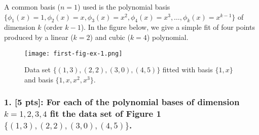 \documentclass{article}
\begin{document}
A common basis (\(n = 1\)) used is the polynomial basis \(\{\phi_1(x) = 1, \phi_2(x) = x, \phi_3(x) = x^2, \phi_4(x) = x^3, \ldots, \phi_k(x) = x^{k-1}\}\) of dimension \(k\) (order \(k - 1\)). In the figure below, we give a simple fit of four points produced by a linear (\(k = 2\)) and cubic (\(k = 4\)) polynomial.

\begin{figure}[H]
    \centering
    \texttt{[image: first-fig-ex-1.png]}
    \caption{Data set \(\{(1,3), (2,2), (3,0), (4,5)\}\) fitted with basis \(\{1, x\}\) and basis \(\{1, x, x^2, x^3\}\).}
    \label{fig:enter-label}
\end{figure}

\subsubsection*{1. [5 pts]: For each of the polynomial bases of dimension \(k = 1, 2, 3, 4\) fit the data set of Figure 1 
\(\{(1,3), (2,2), (3,0), (4,5)\}\).}
\end{document}
